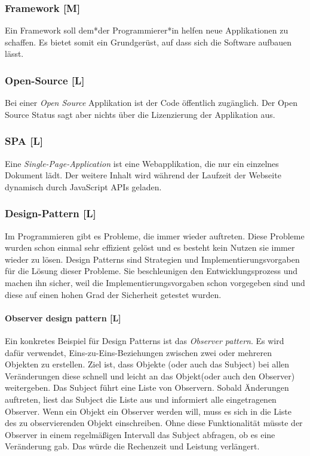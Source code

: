 \subsubsection{Framework [M]}
\label{txt:glos:Framework}

Ein Framework soll dem*der Programmierer*in helfen neue Applikationen zu schaffen. Es bietet somit ein Grundgerüst, auf dass sich die Software aufbauen lässt. \cite{Framework}  

\subsubsection{Open-Source [L]}
Bei einer \emph{Open Source} Applikation ist der Code öffentlich zugänglich. Der Open Source Status sagt aber nichts über die Lizenzierung der Applikation aus. \cite{WhatOpenSource}

\subsubsection{SPA [L]}
Eine \emph{Single-Page-Application} ist eine Webapplikation, die nur ein einzelnes Dokument lädt. Der weitere Inhalt wird während der Laufzeit der Webseite dynamisch durch JavaScript APIs geladen. \cite{WhatSPA}


\subsubsection{Design-Pattern [L]}
Im Programmieren gibt es Probleme, die immer wieder auftreten. Diese Probleme wurden schon einmal sehr effizient gelöst und es besteht kein Nutzen sie immer wieder zu lösen. Design Patterns sind Strategien und Implementierungsvorgaben für die Lösung dieser Probleme. Sie beschleunigen den Entwicklungsprozess und machen ihn sicher, weil die Implementierungsvorgaben schon vorgegeben sind und diese auf einen hohen Grad der Sicherheit getestet wurden. \cite{DesignPatterns}

\paragraph{Observer design pattern [L]}
\label{txt:glos:observerDesignPattern}
Ein konkretes Beispiel für Design Patterns ist das \emph{Observer pattern}. Es wird dafür verwendet, Eins-zu-Eins-Beziehungen zwischen zwei oder mehreren Objekten zu erstellen. Ziel ist, dass Objekte (oder auch das Subject) bei allen Veränderungen diese schnell und leicht an das Objekt(oder auch den Observer) weitergeben.  Das Subject führt eine Liste von Observern. Sobald Änderungen auftreten, liest das Subject die Liste aus und informiert alle eingetragenen Observer. Wenn ein Objekt ein Observer werden will, muss es sich in die Liste des zu observierenden Objekt einschreiben. Ohne diese Funktionalität müsste der Observer in einem regelmäßigen Intervall das Subject abfragen, ob es eine Veränderung gab. Das würde die Rechenzeit und Leistung verlängert. \cite{ObserverPatternExplaination}

